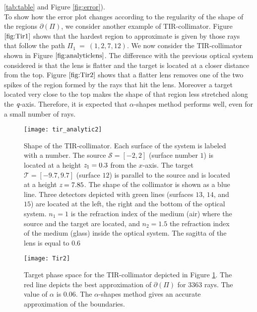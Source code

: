  \ref{tab:table} and Figure \ref{fig:error}).
 \\
 \indent To show how the error plot changes according to the regularity of the shape of the regions $\partial$$(\Pi)$, we consider another example of TIR-collimator.
 Figure $\ref{fig:Tir1}$ shows that the hardest region to approximate is given by those rays that follow the path $\Pi_1 ~=~ (1,2,7,12)$.
 We now consider the TIR-collimator shown in Figure $\ref{fig:analyticlens}$. The difference with the previous optical system considered is that the lens is flatter and the target is located at a closer distance from the top.
Figure $\ref{fig:Tir2}$ shows that a flatter lens removes one of the two spikes of the region formed by the rays that hit the lens.
Moreover a target located very close to the top makes the shape of that region less stretched along the $\textit{q}$-axis.
Therefore, it is expected that $\alpha$-shapes method performs well, even for a small number of rays.
\begin{figure}[h]
  \begin{center}
  \texttt{[image: tir\_analytic2]}
   \end{center}
    \caption{\footnotesize{Shape of the TIR-collimator. Each surface of the system is labeled with a number.
       The source $\mathcal{S}= [-2,2]$ (surface number $1$) is located at a height $\textit{z}_1 = 0.3$ from the $x$-axis.
       The target $\mathcal{T}= [-9.7, 9.7]$ (surface $12$) is parallel to the source and is located at a height $ \textit{z}= 7.85$.
       The shape of the collimator is shown as a blue line.
       Three detectors depicted with green lines (surfaces $13$, $14$, and $15$) are located at the left, the right and the bottom of the optical system.
       $n_1 = 1$ is the refraction index of the medium (air) where the source and the target are located, and
       $n_2 = 1.5 $ the refraction index of the medium (glass) inside the optical system. The sagitta of the lens is equal to $0.6$}}
 \label{fig:analyticlens}
\end{figure}
 \begin{figure}[h]
  \begin{center}
       \texttt{[image: Tir2]}
   \end{center}
        \caption{Target phase space for the TIR-collimator depicted in
        Figure \ref{fig:analyticlens}. The red line depicts the best approximation of $\partial$$(\Pi)$ for $3363$ rays. The value of $\alpha$ is $0.06$.
        The $\alpha$-shapes method gives an accurate approximation of the boundaries.}
  \label{fig:Tir2}
\end{figure}
